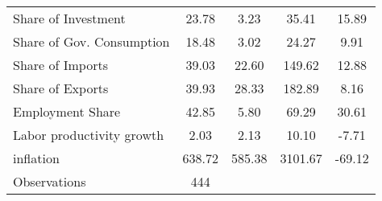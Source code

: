 {\begin{longtable}{l*{1}{cccc}}
Share of Investment &       23.78&        3.23&       35.41&       15.89\\
Share of Gov. Consumption&       18.48&        3.02&       24.27&        9.91\\
Share of Imports    &       39.03&       22.60&      149.62&       12.88\\
Share of Exports    &       39.93&       28.33&      182.89&        8.16\\
Employment Share    &       42.85&        5.80&       69.29&       30.61\\
Labor productivity growth&        2.03&        2.13&       10.10&       -7.71\\
inflation           &      638.72&      585.38&     3101.67&      -69.12\\
\hline
Observations        &         444&            &            &            \\
\hline\hline
\end{longtable}
}
